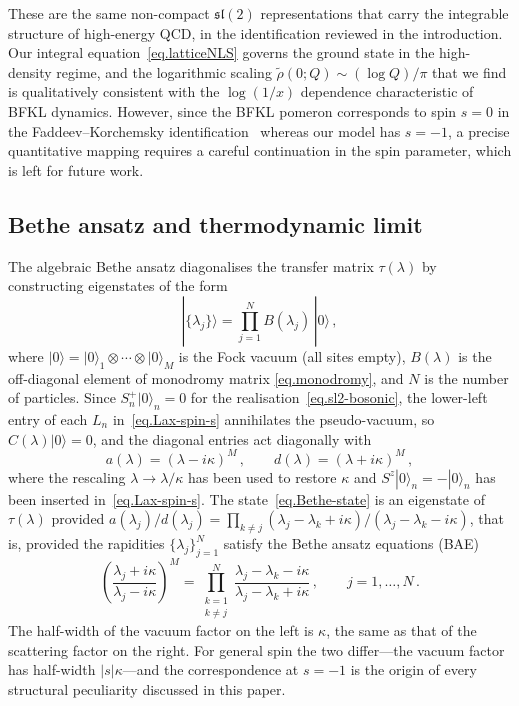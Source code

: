 \documentclass[11pt,a4paper]{article}
\theoremstyle{definition}
\begin{document}
These are the same non-compact $\mathfrak{sl}(2)$ representations that carry the
integrable structure of high-energy QCD, in the identification reviewed in the
introduction.  Our integral equation~\eqref{eq.latticeNLS} governs the ground state
in the high-density regime, and the logarithmic scaling $\tilde\rho(0;Q) \sim (\log Q)/\pi$ that we find
is qualitatively consistent with the $\log(1/x)$ dependence characteristic of BFKL dynamics.
However, since the BFKL pomeron corresponds to spin $s = 0$ in the
Faddeev--Korchemsky identification~\cite{FaddeevKorchemsky1995} whereas our model has $s = -1$, a precise quantitative
mapping requires a careful continuation in the spin parameter, which is left for future work.


\subsection{Bethe ansatz and thermodynamic limit}
\label{sec.bethe-ansatz}
The algebraic Bethe ansatz diagonalises the transfer matrix
$\tau(\lambda)$ by constructing eigenstates of the form
\begin{equation}\label{eq.Bethe-state}
  |\{\lambda_j\}\rangle = \prod_{j=1}^{N}B(\lambda_j)\,|0\rangle\,,
\end{equation}
where $|0\rangle = |0\rangle_1 \otimes \cdots \otimes |0\rangle_M$ is
the Fock vacuum (all sites empty), $B(\lambda)$ is the off-diagonal
element of monodromy matrix \eqref{eq.monodromy}, and $N$ is the
number of particles.
Since $S^+_n|0\rangle_n = 0$ for the realisation~\eqref{eq.sl2-bosonic}, the
lower-left entry of each $L_n$ in~\eqref{eq.Lax-spin-s} annihilates the
pseudo-vacuum, so $C(\lambda)|0\rangle = 0$, and the diagonal entries act
diagonally with
\begin{equation}\label{eq.vacuum-eigenvalues}
  a(\lambda) = (\lambda - i\kappa)^{M}\,,
  \qquad
  d(\lambda) = (\lambda + i\kappa)^{M}\,,
\end{equation}
where the rescaling $\lambda \to \lambda/\kappa$ has been used to restore
$\kappa$ and $S^z|0\rangle_n = -|0\rangle_n$ has been inserted
in~\eqref{eq.Lax-spin-s}.
The state~\eqref{eq.Bethe-state} is an eigenstate of $\tau(\lambda)$ provided
$a(\lambda_j)/d(\lambda_j) = \prod_{k\neq j}
(\lambda_j-\lambda_k+i\kappa)/(\lambda_j-\lambda_k-i\kappa)$, that is, provided
the rapidities $\{\lambda_j\}_{j=1}^N$ satisfy the Bethe ansatz equations
(BAE)~\cite{KorepinBogoliubovIzergin1993, HaoEtAl2019, ZhongEtAl2025}
\begin{equation}\label{eq.BAE}
  \left(\frac{\lambda_j + i\kappa}{\lambda_j - i\kappa}\right)^M
  = \prod_{\substack{k=1 \\ k \neq j}}^{N}
  \frac{\lambda_j - \lambda_k - i\kappa}
       {\lambda_j - \lambda_k + i\kappa}\,,
  \qquad j = 1, \ldots, N\,.
\end{equation}
The half-width of the vacuum factor on the left is $\kappa$, the same as that
of the scattering factor on the right.  For general spin the two differ---the
vacuum factor has half-width $|s|\kappa$---and the correspondence at $s = -1$ is
the origin of every structural peculiarity discussed in this paper.
\end{document}
